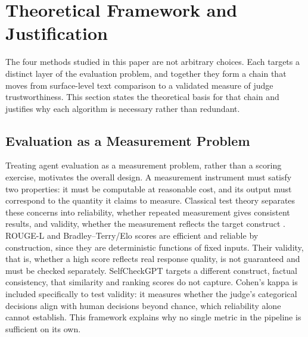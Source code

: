 \documentclass[conference]{IEEEtran}
\begin{document}
\section{Theoretical Framework and Justification}
The four methods studied in this paper are not arbitrary choices. Each targets a distinct layer of the evaluation problem, and together they form a chain that moves from surface-level text comparison to a validated measure of judge trustworthiness. This section states the theoretical basis for that chain and justifies why each algorithm is necessary rather than redundant.

\subsection{Evaluation as a Measurement Problem}
Treating agent evaluation as a measurement problem, rather than a scoring exercise, motivates the overall design. A measurement instrument must satisfy two properties: it must be computable at reasonable cost, and its output must correspond to the quantity it claims to measure. Classical test theory separates these concerns into reliability, whether repeated measurement gives consistent results, and validity, whether the measurement reflects the target construct \cite{cohen1960coefficient}. ROUGE-L and Bradley--Terry/Elo scores are efficient and reliable by construction, since they are deterministic functions of fixed inputs. Their validity, that is, whether a high score reflects real response quality, is not guaranteed and must be checked separately. SelfCheckGPT targets a different construct, factual consistency, that similarity and ranking scores do not capture. Cohen's kappa is included specifically to test validity: it measures whether the judge's categorical decisions align with human decisions beyond chance, which reliability alone cannot establish. This framework explains why no single metric in the pipeline is sufficient on its own.
\end{document}
